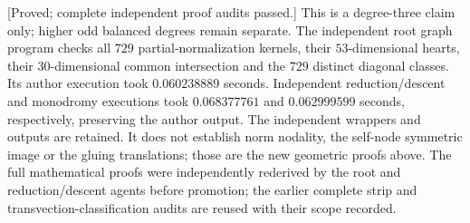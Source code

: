 \begin{remark}
\label{rem:mixed-d3-norm-scope-candidate}
\textup{[Proved; complete independent proof audits passed.]}
This is a degree-three claim only; higher odd balanced degrees
remain separate. The independent root graph program
checks all $729$ partial-normalization kernels, their
$53$-dimensional hearts, their $30$-dimensional common
intersection and the $729$ distinct diagonal classes.
Its author execution took $0.060238889$ seconds. Independent
reduction/descent and monodromy executions took $0.068377761$
and $0.062999599$ seconds, respectively, preserving the author
output. The independent wrappers and outputs are retained.
It does not establish norm nodality, the self-node symmetric
image or the gluing translations; those are the new geometric
proofs above. The full mathematical proofs were independently
rederived by the root and reduction/descent agents before promotion;
the earlier complete strip and transvection-classification audits
are reused with their scope recorded.
\end{remark}
